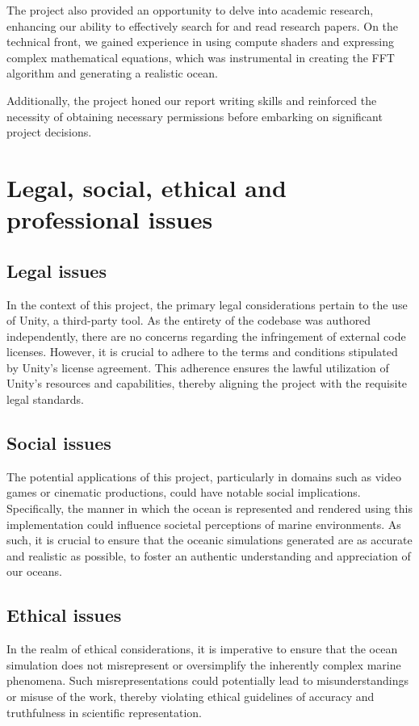 \begin{appendices}
The project also provided an opportunity to delve into academic research, enhancing our ability to effectively search for and read research papers. On the technical front, we gained experience in using compute shaders and expressing complex mathematical equations, which was instrumental in creating the FFT algorithm and generating a realistic ocean.

Additionally, the project honed our report writing skills and reinforced the necessity of obtaining necessary permissions before embarking on significant project decisions.

\section{Legal, social, ethical and professional issues}

\subsection{Legal issues}
In the context of this project, the primary legal considerations pertain to the use of Unity, a third-party tool. As the entirety of the codebase was authored independently, there are no concerns regarding the infringement of external code licenses. However, it is crucial to adhere to the terms and conditions stipulated by Unity’s license agreement. This adherence ensures the lawful utilization of Unity’s resources and capabilities, thereby aligning the project with the requisite legal standards.

\subsection{Social issues}
The potential applications of this project, particularly in domains such as video games or cinematic productions, could have notable social implications. Specifically, the manner in which the ocean is represented and rendered using this implementation could influence societal perceptions of marine environments. As such, it is crucial to ensure that the oceanic simulations generated are as accurate and realistic as possible, to foster an authentic understanding and appreciation of our oceans.

\subsection{Ethical issues}
In the realm of ethical considerations, it is imperative to ensure that the ocean simulation does not misrepresent or oversimplify the inherently complex marine phenomena. Such misrepresentations could potentially lead to misunderstandings or misuse of the work, thereby violating ethical guidelines of accuracy and truthfulness in scientific representation.


\end{appendices}

